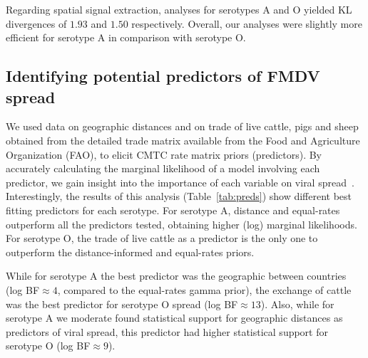 \documentclass[10pt]{article}
\begin{document}
Regarding spatial signal extraction, analyses for serotypes  A and O yielded KL divergences of $1.93$ and $1.50$ respectively.
Overall, our analyses were slightly more efficient for serotype A in comparison with serotype O.

\subsection*{Identifying potential predictors of FMDV spread}

We used data on geographic distances and on trade of live cattle, pigs and sheep obtained from the detailed trade matrix available from the Food and Agriculture Organization (FAO), to elicit CMTC rate matrix priors (predictors).
By accurately calculating the marginal likelihood of a model involving each predictor, we gain insight into the importance of each variable on viral spread~\cite{Carvalho2013, Nelson2011}.
%
Interestingly, the results of this analysis (Table~\ref{tab:preds}) show different best fitting predictors for each serotype.
For serotype A, distance and equal-rates outperform all the predictors tested, obtaining higher (log) marginal likelihoods.
For serotype O, the trade of live cattle as a predictor is the only one to outperform the distance-informed and equal-rates  priors.

While for serotype A the best predictor was the geographic between countries (log BF$\approx 4$, compared to the equal-rates gamma prior), the exchange of cattle was the best predictor for serotype O spread (log BF$\approx 13$).
Also, while for serotype A we moderate found statistical support for geographic distances as predictors of viral spread, this predictor had higher statistical support for serotype O (log BF$\approx 9$).
\end{document}

